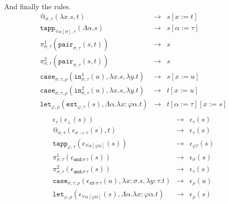 \documentclass[runningheads,a4paper]{llncs}
\newcommand{\quant}[2]{\forall #1[#2]}
\newcommand{\red}{\longrightarrow}
\newcommand{\arrtype}{\rightarrow}
\newcommand{\abs}[2]{\lambda #1.#2}
\newcommand{\tabs}[2]{\Lambda #1.#2}
\begin{document}
And finally the rules.
\[
\begin{array}{rcl}
@_{\sigma,\tau}(\abs{x}{s},t) & \red & s[x:=t] \\
\mathtt{tapp}_{\quant{\alpha}{\sigma},\tau}(\tabs{\alpha}{s}) & \red &
  s[\alpha:=\tau] \\
\pi^1_{\sigma,\tau}(\mathtt{pair}_{\sigma,\tau}(s,t)) & \red & s \\
\pi^2_{\sigma,\tau}(\mathtt{pair}_{\sigma,\tau}(s,t)) & \red & s \\
\mathtt{case}_{\sigma,\tau,\rho}(\mathtt{in}^1_{\sigma,\tau}(u),
  \abs{x}{s},\abs{y}{t}) & \red & s[x:=u] \\
\mathtt{case}_{\sigma,\tau,\rho}(\mathtt{in}^2_{\sigma,\tau}(u),
  \abs{x}{s},\abs{y}{t}) & \red & t[x:=u] \\
\mathtt{let}_{\varphi,\rho}(\mathtt{ext}_{\varphi,\tau}(s),\tabs{\alpha}{\abs{x:\varphi \alpha}{t}}) & \red & t[\alpha:=\tau][x:=s] \\
\end{array}
\]
\[
\begin{array}{rcl}
\epsilon_\tau(\epsilon_\bot(s)) & \red & \epsilon_\tau(s) \\
@_{\sigma,\tau}(\epsilon_{\sigma \arrtype \tau}(s),t) & \red &
  \epsilon_\tau(s) \\
\mathtt{tapp}_{\varphi,\tau}(
  \epsilon_{\quant{\alpha}{\varphi\alpha}}(s)) & \red &
  \epsilon_{\varphi\tau}(s) \\
\pi^1_{\sigma,\tau}(\epsilon_{\mathtt{and}\,\sigma\,\tau}(s)) & \red &
  \epsilon_\sigma(s) \\
\pi^2_{\sigma,\tau}(\epsilon_{\mathtt{and}\,\sigma\,\tau}(s)) & \red &
  \epsilon_\tau(s) \\
\mathtt{case}_{\sigma,\tau,\rho}(\epsilon_{\mathtt{or}\,\sigma\,\tau}(
  u),\abs{x:\sigma}{s},\abs{y:\tau}{t}) & \red & \epsilon_\rho(u) \\
\mathtt{let}_{\varphi,\rho}(\epsilon_{\forall\alpha[\varphi\alpha]}(s),\tabs{\alpha}{\abs{x:\varphi\alpha}{t}}) & \red &
  \epsilon_\rho(s) \\
\end{array}
\]
\end{document}
